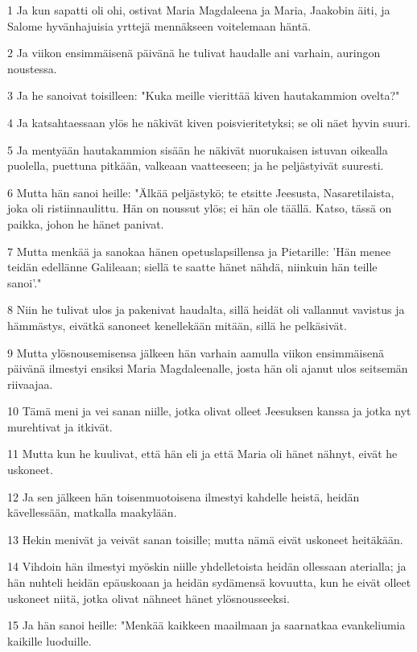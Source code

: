 \par 1 Ja kun sapatti oli ohi, ostivat Maria Magdaleena ja Maria, Jaakobin äiti, ja Salome hyvänhajuisia yrttejä mennäkseen voitelemaan häntä.
\par 2 Ja viikon ensimmäisenä päivänä he tulivat haudalle ani varhain, auringon noustessa.
\par 3 Ja he sanoivat toisilleen: "Kuka meille vierittää kiven hautakammion ovelta?"
\par 4 Ja katsahtaessaan ylös he näkivät kiven poisvieritetyksi; se oli näet hyvin suuri.
\par 5 Ja mentyään hautakammion sisään he näkivät nuorukaisen istuvan oikealla puolella, puettuna pitkään, valkeaan vaatteeseen; ja he peljästyivät suuresti.
\par 6 Mutta hän sanoi heille: "Älkää peljästykö; te etsitte Jeesusta, Nasaretilaista, joka oli ristiinnaulittu. Hän on noussut ylös; ei hän ole täällä. Katso, tässä on paikka, johon he hänet panivat.
\par 7 Mutta menkää ja sanokaa hänen opetuslapsillensa ja Pietarille: 'Hän menee teidän edellänne Galileaan; siellä te saatte hänet nähdä, niinkuin hän teille sanoi'."
\par 8 Niin he tulivat ulos ja pakenivat haudalta, sillä heidät oli vallannut vavistus ja hämmästys, eivätkä sanoneet kenellekään mitään, sillä he pelkäsivät.
\par 9 Mutta ylösnousemisensa jälkeen hän varhain aamulla viikon ensimmäisenä päivänä ilmestyi ensiksi Maria Magdaleenalle, josta hän oli ajanut ulos seitsemän riivaajaa.
\par 10 Tämä meni ja vei sanan niille, jotka olivat olleet Jeesuksen kanssa ja jotka nyt murehtivat ja itkivät.
\par 11 Mutta kun he kuulivat, että hän eli ja että Maria oli hänet nähnyt, eivät he uskoneet.
\par 12 Ja sen jälkeen hän toisenmuotoisena ilmestyi kahdelle heistä, heidän kävellessään, matkalla maakylään.
\par 13 Hekin menivät ja veivät sanan toisille; mutta nämä eivät uskoneet heitäkään.
\par 14 Vihdoin hän ilmestyi myöskin niille yhdelletoista heidän ollessaan aterialla; ja hän nuhteli heidän epäuskoaan ja heidän sydämensä kovuutta, kun he eivät olleet uskoneet niitä, jotka olivat nähneet hänet ylösnousseeksi.
\par 15 Ja hän sanoi heille: "Menkää kaikkeen maailmaan ja saarnatkaa evankeliumia kaikille luoduille.
